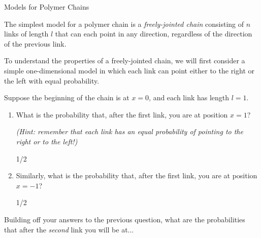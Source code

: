 \begin{activity}{Models for Polymer Chains}
\begin{instructornotes}
\end{instructornotes}


\begin{model}
\label{\labelbase:mdl:randomwalks}

	The simplest model for a polymer chain is a \emph{freely-jointed chain} consisting of $n$ links of length $l$ that can each point in any direction, regardless of the direction of the previous link.
	
	To understand the properties of a freely-jointed chain, we will first consider a simple one-dimensional model in which each link can point either to the right or the left with equal probability.

\end{model}


\begin{ctqs}

	\question Suppose the beginning of the chain is at $x=0$, and each link has length $l=1$.
	
		\begin{enumerate}
			\item What is the probability that, after the first link, you are at position $x=1$?
			
				\emph{(Hint: remember that each link has an equal probability of pointing to the right or to the left!)}
				
				\begin{solution}[0.5in]
				
					1/2
					
				\end{solution}
				
			\item Similarly, what is the probability that, after the first link, you are at position $x=-1$?
				
				\begin{solution}[0.5in]
				
					1/2				
				
				\end{solution}
			
		\end{enumerate}
		
	\question Building off your answers to the previous question, what are the probabilities that after the \emph{second} link you will be at...
	
		\begin{enumerate}
			

\end{enumerate}
\end{ctqs}
\end{activity}
